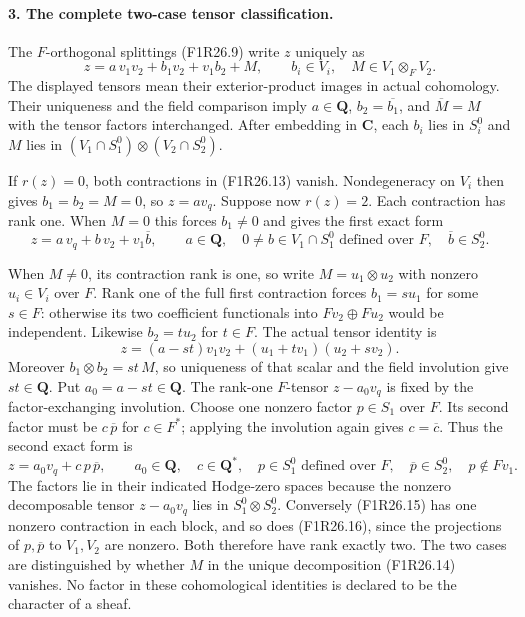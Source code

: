 \paragraph{3. The complete two-case tensor classification.}
The $F$-orthogonal splittings (F1R26.9) write
$z$ uniquely as
\[
 z=a\,v_1v_2+b_1v_2+v_1b_2+M,\qquad
          b_i\in V_i,\quad M\in V_1\otimes_FV_2.
 \tag{F1R26.14}
\]
The displayed tensors mean their exterior-product
images in actual cohomology. Their uniqueness
and the field comparison imply
$a\in\mathbf Q$, $b_2=\overline{b_1}$, and
$\overline M=M$ with the tensor factors
interchanged. After embedding in $\mathbf C$,
each $b_i$ lies in $S_i^0$ and
$M$ lies in $(V_1\cap S_1^0)\otimes(V_2\cap S_2^0)$.

If $r(z)=0$, both contractions in (F1R26.13)
vanish. Nondegeneracy on $V_i$ then gives
$b_1=b_2=M=0$, so $z=a v_q$.
Suppose now $r(z)=2$. Each contraction has rank one.
When $M=0$ this forces $b_1\ne0$ and gives the
first exact form
\[
             z=a\,v_q+b\,v_2+v_1\overline b,\qquad
             a\in\mathbf Q,\quad
             0\ne b\in V_1\cap S_1^0
                       \text{ defined over }F,\quad
                       \overline b\in S_2^0.
 \tag{F1R26.15}
\]

When $M\ne0$, its contraction rank is one, so
write $M=u_1\otimes u_2$ with nonzero $u_i\in V_i$
over $F$. Rank one of the full first contraction
forces $b_1=s u_1$ for some $s\in F$:
otherwise its two coefficient functionals into
$Fv_2\oplus Fu_2$ would be independent.
Likewise $b_2=t u_2$ for $t\in F$.
The actual tensor identity is
\[
 z=(a-st)v_1v_2+(u_1+t v_1)(u_2+s v_2).
\]
Moreover $b_1\otimes b_2=st\,M$, so uniqueness
of that scalar and the field involution give
$st\in\mathbf Q$. Put $a_0=a-st\in\mathbf Q$.
The rank-one $F$-tensor $z-a_0v_q$ is fixed by
the factor-exchanging involution. Choose one
nonzero factor $p\in S_1$ over $F$. Its second
factor must be $c\,\overline p$ for $c\in F^*$;
applying the involution again gives $c=\overline c$.
Thus the second exact form is
\[
             z=a_0v_q+c\,p\,\overline p,\qquad
             a_0\in\mathbf Q,\quad c\in\mathbf Q^*,\quad
             p\in S_1^0\text{ defined over }F,\quad
             \overline p\in S_2^0,\quad
             p\notin Fv_1.
 \tag{F1R26.16}
\]
The factors lie in their indicated Hodge-zero
spaces because the nonzero decomposable tensor
$z-a_0v_q$ lies in $S_1^0\otimes S_2^0$.
Conversely (F1R26.15) has one nonzero contraction
in each block, and so does (F1R26.16), since
the projections of $p,\overline p$ to $V_1,V_2$
are nonzero. Both therefore have rank exactly two.
The two cases are distinguished by whether
$M$ in the unique decomposition (F1R26.14)
vanishes. No factor in these cohomological
identities is declared to be the character
of a sheaf.

